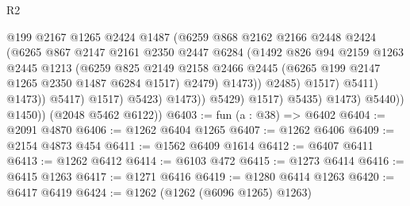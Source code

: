 \begin{lexlean}{R2}
\begin{coremodule}
                                        @199
                                        @2167
                                        @1265
                                        @2424
                                        @1487
                                        (@6259
                                          @868
                                          @2162
                                          @2166
                                          @2448
                                          @2424
                                          (@6265
                                            @867
                                            @2147
                                            @2161
                                            @2350
                                            @2447
                                            @6284
                                            (@1492
                                              @826
                                              @94
                                              @2159
                                              @1263
                                              @2445
                                              @1213
                                              (@6259
                                                @825
                                                @2149
                                                @2158
                                                @2466
                                                @2445
                                                (@6265 @199 @2147 @1265 @2350 @1487 @6284 @1517)
                                                @2479)
                                              @1473))
                                          @2485)
                                        @1517)
                                      @5411)
                                    @1473))
                                @5417)
                              @1517)
                            @5423)
                          @1473))
                      @5429)
                    @1517)
                  @5435)
                @1473)
              @5440))
          @1450))
      (@2048 @5462 @6122))
@6403 := fun (a : @38) => @6402
@6404 := @2091 @4870
@6406 := @1262 @6404 @1265
@6407 := @1262 @6406
@6409 := @2154 @4873 @454
@6411 := @1562 @6409 @1614
@6412 := @6407 @6411
@6413 := @1262 @6412
@6414 := @6103 @472
@6415 := @1273 @6414
@6416 := @6415 @1263
@6417 := @1271 @6416
@6419 := @1280 @6414 @1263
@6420 := @6417 @6419
@6424 := @1262 (@1262 (@6096 @1265) @1263)

\end{coremodule}
\end{lexlean}
